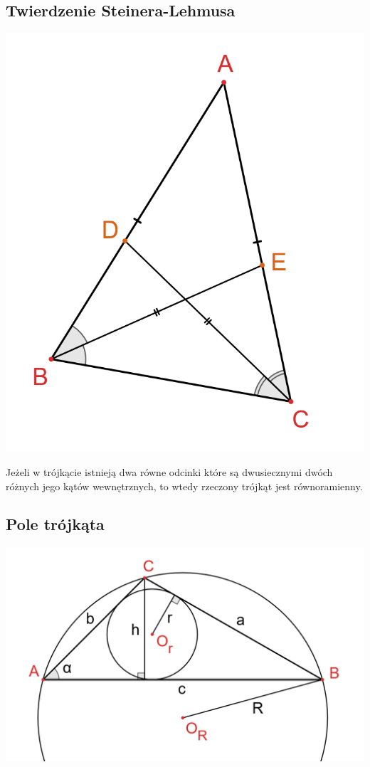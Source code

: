 \documentclass[14pt,a4paper]{extarticle}
\begin{document}
\subsection{Twierdzenie Steinera-Lehmusa}
\begin{center}\includegraphics[scale=0.4]{geometria/twierdzenie Steinera-Lehmusa.png}\end{center}
\noindent Jeżeli w trójkącie istnieją dwa równe odcinki które są dwusiecznymi dwóch różnych jego kątów wewnętrznych,
to wtedy rzeczony trójkąt jest równoramienny.

\subsection{Pole trójkąta}
\begin{center}\includegraphics[scale=0.5]{geometria/pole trójkąta.png}\end{center}
\end{document}
